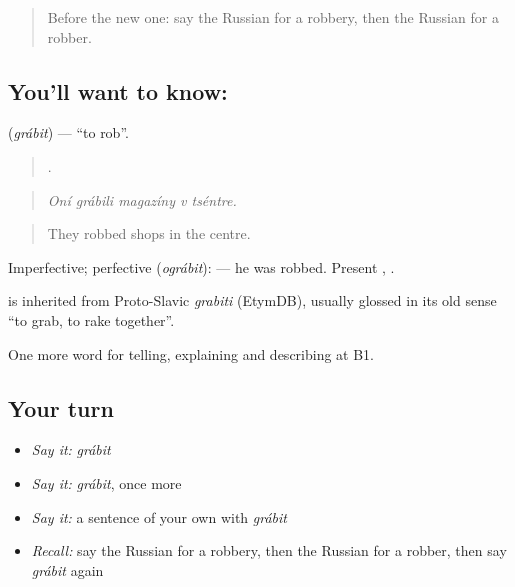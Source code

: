 \label{lesson:RU-C289-grabit}



\begin{quote}
Before the new one: say the Russian for a robbery, then the Russian for a robber.
\end{quote}

\subsection*{You'll want to know: }
\textbf{} (\emph{grábit}) — \textquotedblleft{}to rob\textquotedblright{}.

\begin{quote}
    .
\end{quote}

\begin{quote}
\emph{Oní grábili magazíny v tséntre.}
\end{quote}

\begin{quote}
They robbed shops in the centre.
\end{quote}

Imperfective; perfective \emph{} (\emph{ográbit}): \emph{ } — he was robbed. Present \emph{}, \emph{}.

\begin{cousinweb}
\emph{} is inherited from Proto-Slavic \emph{grabiti} (EtymDB), usually glossed in its old sense \textquotedblleft{}to grab, to rake together\textquotedblright{}.
\end{cousinweb}

\begin{grammarlens}[title={What you've built}]
One more word for telling, explaining and describing at B1.
\end{grammarlens}

\subsection*{Your turn}
\begin{itemize}
\raggedright
  \item \emph{Say it:} \emph{grábit}
  \item \emph{Say it:} \emph{grábit}, once more
  \item \emph{Say it:} a sentence of your own with \emph{grábit}
  \item \emph{Recall:} say the Russian for a robbery, then the Russian for a robber, then say \emph{grábit} again
\end{itemize}

